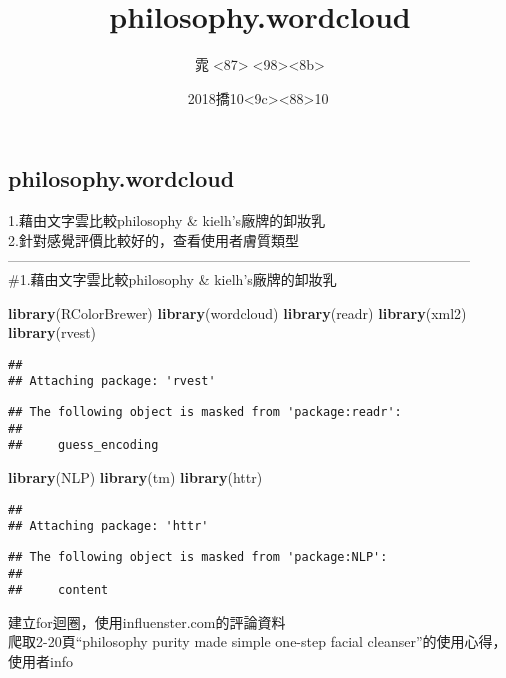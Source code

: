 \documentclass[]{article}
\title{philosophy.wordcloud}
\author{雿\textless{}87\textgreater{}\textless{}98\textgreater{}\textless{}8b\textgreater{}}
\date{2018撟10\textless{}9c\textgreater{}\textless{}88\textgreater{}10}
\newenvironment{Shaded}{\begin{snugshade}}{\end{snugshade}}
\newcommand{\KeywordTok}[1]{\textcolor[rgb]{0.13,0.29,0.53}{\textbf{{#1}}}}
\newcommand{\NormalTok}[1]{{#1}}
\begin{document}
\maketitle

\subsection{philosophy.wordcloud}\label{philosophy.wordcloud}

1.藉由文字雲比較philosophy \& kielh's廠牌的卸妝乳\\
2.針對感覺評價比較好的，查看使用者膚質類型
---------------------------------------------------------------------------------------------------\\
\#1.藉由文字雲比較philosophy \& kielh's廠牌的卸妝乳

\begin{Shaded}
\begin{Highlighting}[]
\KeywordTok{library}\NormalTok{(RColorBrewer)}
\KeywordTok{library}\NormalTok{(wordcloud)}
\KeywordTok{library}\NormalTok{(readr)}
\KeywordTok{library}\NormalTok{(xml2)}
\KeywordTok{library}\NormalTok{(rvest)}
\end{Highlighting}
\end{Shaded}

\begin{verbatim}
## 
## Attaching package: 'rvest'
\end{verbatim}

\begin{verbatim}
## The following object is masked from 'package:readr':
## 
##     guess_encoding
\end{verbatim}

\begin{Shaded}
\begin{Highlighting}[]
\KeywordTok{library}\NormalTok{(NLP)}
\KeywordTok{library}\NormalTok{(tm)}
\KeywordTok{library}\NormalTok{(httr)}
\end{Highlighting}
\end{Shaded}

\begin{verbatim}
## 
## Attaching package: 'httr'
\end{verbatim}

\begin{verbatim}
## The following object is masked from 'package:NLP':
## 
##     content
\end{verbatim}

建立for迴圈，使用influenster.com的評論資料\\
爬取2-20頁``philosophy purity made simple one-step facial
cleanser''的使用心得，使用者info
\end{document}
